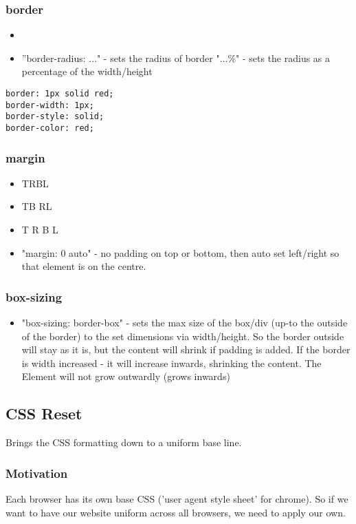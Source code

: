 \documentclass[]{article}
\newcommand{\<}{\guilsinglleft}
\renewcommand{\>}{\guilsinglright}
\begin{document}
\subsubsection{border}
\begin{itemize}
	\item
	\item ''border-radius: ..." - sets the radius of border
	\subitem "...\%" - sets the radius as a percentage of the width/height
\end{itemize}
\begin{lstlisting}
border: 1px solid red;
border-width: 1px;
border-style: solid;
border-color: red;
\end{lstlisting}

\subsubsection{margin}
\begin{itemize}
	\item TRBL
	\item TB RL
	\item T R B L
	\item "margin: 0 auto" - no padding on top or bottom, then auto set left/right so that element is on the centre.
\end{itemize}

\subsubsection{box-sizing}
\begin{itemize}
	\item "box-sizing: border-box" - sets the max size of the box/div (up-to the outside of the border) to the set dimensions via width/height.  So the border outside will stay as it is, but the content will shrink if padding is added.  If the border is width increased - it will increase inwards, shrinking the content.  The Element will not grow outwardly (grows inwards) 
\end{itemize}

\subsection{CSS Reset}
Brings the CSS formatting down to a uniform base line.
\subsubsection{Motivation}
Each browser has its own base CSS ('user agent style sheet'  for chrome).  So if we want to have our website uniform across all browsers, we need to apply our own.
\end{document}
